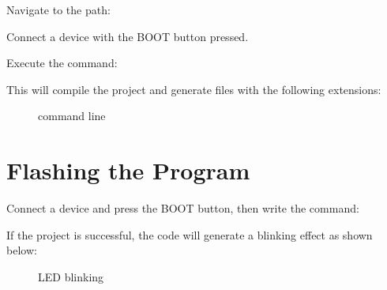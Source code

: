 \documentclass[letterpaper,10pt,english]{sphinxmanual}
\begin{document}
\sphinxAtStartPar
Navigate to the path:

\begin{sphinxVerbatim}[commandchars=\\\{\}]
 
\end{sphinxVerbatim}

\sphinxAtStartPar
Connect a device with the BOOT button pressed.

\sphinxAtStartPar
Execute the command:

\begin{sphinxVerbatim}[commandchars=\\\{\}]
 
\end{sphinxVerbatim}

\sphinxAtStartPar
This will compile the project and generate files with the following extensions:

\begin{figure}[htbp]
\centering
\capstart

\noindent{}
\caption{command line}\label{\detokenize{compile:id1}}\label{\detokenize{compile:files}}\end{figure}


\section{Flashing the Program}
\label{\detokenize{compile:flashing-the-program}}
\sphinxAtStartPar
Connect a device and press the BOOT button, then write the command:

\begin{sphinxVerbatim}[commandchars=\\\{\}]
 
\end{sphinxVerbatim}

\sphinxAtStartPar
If the project is successful, the code will generate a blinking effect as shown below:

\begin{figure}[htbp]
\centering
\capstart

\noindent{}
\caption{LED blinking}\label{\detokenize{compile:id2}}\label{\detokenize{compile:led}}\end{figure}

\sphinxstepscope
\end{document}
